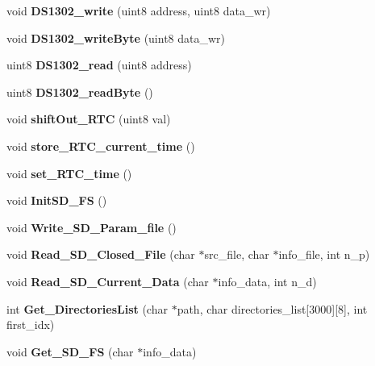 \begin{DoxyCompactItemize}
\item 
\mbox{\label{_s_d___r_t_c__functions_8c_ae916e48139e2369b4295bc32b754cb09}} 
void {\bfseries D\+S1302\+\_\+write} (uint8 address, uint8 data\+\_\+wr)
\item 
\mbox{\label{_s_d___r_t_c__functions_8c_abf7dafb7cb2decd885c06cfd0d508a86}} 
void {\bfseries D\+S1302\+\_\+write\+Byte} (uint8 data\+\_\+wr)
\item 
\mbox{\label{_s_d___r_t_c__functions_8c_a648ecf3d4f3a92e6390945b156d5c98a}} 
uint8 {\bfseries D\+S1302\+\_\+read} (uint8 address)
\item 
\mbox{\label{_s_d___r_t_c__functions_8c_a961280caa20d802239a974419c19437e}} 
uint8 {\bfseries D\+S1302\+\_\+read\+Byte} ()
\item 
\mbox{\label{_s_d___r_t_c__functions_8c_a1f5533e91998b92926173f479322c7d9}} 
void {\bfseries shift\+Out\+\_\+\+R\+TC} (uint8 val)
\item 
\mbox{\label{_s_d___r_t_c__functions_8c_a262170705e582875a383a9f5c9b137a7}} 
void {\bfseries store\+\_\+\+R\+T\+C\+\_\+current\+\_\+time} ()
\item 
\mbox{\label{_s_d___r_t_c__functions_8c_ad0181162f59bf423c6d1dc1556afb6fc}} 
void {\bfseries set\+\_\+\+R\+T\+C\+\_\+time} ()
\item 
\mbox{\label{_s_d___r_t_c__functions_8c_a56466454f41dc875787a75f0d78b5602}} 
void {\bfseries Init\+S\+D\+\_\+\+FS} ()
\item 
\mbox{\label{_s_d___r_t_c__functions_8c_a5072914b0c92c6825bb196ba84b332c4}} 
void {\bfseries Write\+\_\+\+S\+D\+\_\+\+Param\+\_\+file} ()
\item 
\mbox{\label{_s_d___r_t_c__functions_8c_a6b2c27a6f210244a09b525837f26173e}} 
void {\bfseries Read\+\_\+\+S\+D\+\_\+\+Closed\+\_\+\+File} (char $\ast$src\+\_\+file, char $\ast$info\+\_\+file, int n\+\_\+p)
\item 
\mbox{\label{_s_d___r_t_c__functions_8c_ab648a805d5eb90d169ba04ca02bd3d7d}} 
void {\bfseries Read\+\_\+\+S\+D\+\_\+\+Current\+\_\+\+Data} (char $\ast$info\+\_\+data, int n\+\_\+d)
\item 
\mbox{\label{_s_d___r_t_c__functions_8c_ac3a7b606d29e076ac0b4fa78b46a56a1}} 
int {\bfseries Get\+\_\+\+Directories\+List} (char $\ast$path, char directories\+\_\+list[3000][8], int first\+\_\+idx)
\item 
\mbox{\label{_s_d___r_t_c__functions_8c_a87037855d644f226866ed0fcfb5ca025}} 
void {\bfseries Get\+\_\+\+S\+D\+\_\+\+FS} (char $\ast$info\+\_\+data)
\end{DoxyCompactItemize}


